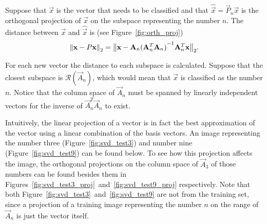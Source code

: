 Suppose that \(\vec{x}\) is the vector that needs to be classified and that \(\hat{\vec{x}} = \vec{P}_n\vec{x}\) is the orthogonal projection of \(\vec{x}\) on the subspace representing the number \(n\).
The distance between \(\vec{x}\) and \(\hat{\vec{x}}\) is (see Figure~\ref{fig:orth_proj})
\[\left\lVert\mathbf{x} - P\mathbf{x}\right\rVert_2 = \big\lVert\mathbf{x} - \mathbf{A}_n{(\mathbf{A}_n^T \mathbf{A}_n)}^{-1}\mathbf{A}_n^T\mathbf{x}\big\rVert_2. \]

For each new vector the distance to each subspace is calculated.
Suppose that the closest subspace is \(\mathcal{R}(\vec{A}_n)\), which would mean that \(\vec{x}\) is classified as the number \(n\).
Notice that the column space of \(\vec{A}_n\) must be spanned by linearly independent vectors for the inverse of \(\vec{A}_n^T \vec{A}_n\) to exist.

Intuitively, the linear projection of a vector is in fact the best approximation of the vector using a linear combination of the basis vectors.
An image representing the number three (Figure~\ref{fig:svd_test3}) and number nine (Figure~\ref{fig:svd_test9}) can be found below.
To see how this projection affects the image, the orthogonal projections on the column space of \(\vec{A}_3\) of those numbers can be found besides them in Figures~\ref{fig:svd_test3_proj}~and~\ref{fig:svd_test9_proj} respectively.
Note that both Figure~\ref{fig:svd_test3}~and~\ref{fig:svd_test9} are not from the training set, since a projection of a training image representing the number \(n\) on the range of \(\vec{A}_n\) is just the vector itself.

